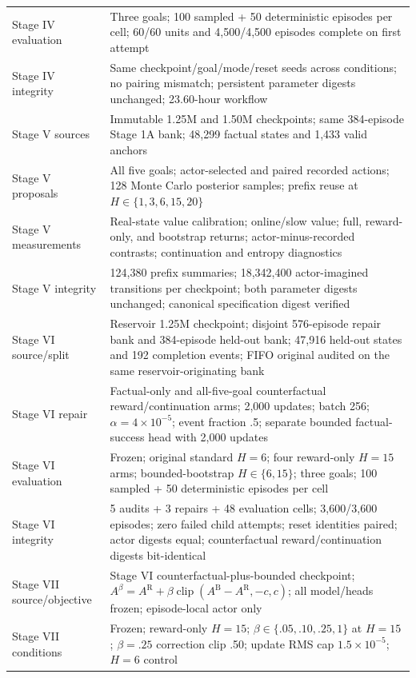 \documentclass[10pt]{article}
\begin{document}
{\begin{longtable}{>{\raggedright\arraybackslash}p{.24\linewidth}p{.68\linewidth}}
Stage IV evaluation & Three goals; 100 sampled + 50 deterministic episodes per cell; 60/60 units and 4,500/4,500 episodes complete on first attempt \\
Stage IV integrity & Same checkpoint/goal/mode/reset seeds across conditions; no pairing mismatch; persistent parameter digests unchanged; 23.60-hour workflow \\
Stage V sources & Immutable 1.25M and 1.50M checkpoints; same 384-episode Stage 1A bank; 48,299 factual states and 1,433 valid anchors \\
Stage V proposals & All five goals; actor-selected and paired recorded actions; 128 Monte Carlo posterior samples; prefix reuse at $H\in\{1,3,6,15,20\}$ \\
Stage V measurements & Real-state value calibration; online/slow value; full, reward-only, and bootstrap returns; actor-minus-recorded contrasts; continuation and entropy diagnostics \\
Stage V integrity & 124,380 prefix summaries; 18,342,400 actor-imagined transitions per checkpoint; both parameter digests unchanged; canonical specification digest verified \\
Stage VI source/split & Reservoir 1.25M checkpoint; disjoint 576-episode repair bank and 384-episode held-out bank; 47,916 held-out states and 192 completion events; FIFO original audited on the same reservoir-originating bank \\
Stage VI repair & Factual-only and all-five-goal counterfactual reward/continuation arms; 2,000 updates; batch 256; $\alpha=4\times10^{-5}$; event fraction .5; separate bounded factual-success head with 2,000 updates \\
Stage VI evaluation & Frozen; original standard $H=6$; four reward-only $H=15$ arms; bounded-bootstrap $H\in\{6,15\}$; three goals; 100 sampled + 50 deterministic episodes per cell \\
Stage VI integrity & 5 audits + 3 repairs + 48 evaluation cells; 3,600/3,600 episodes; zero failed child attempts; reset identities paired; actor digests equal; counterfactual reward/continuation digests bit-identical \\
Stage VII source/objective & Stage VI counterfactual-plus-bounded checkpoint; $A^\beta=A^{\mathrm R}+\beta\operatorname{clip}(A^{\mathrm B}-A^{\mathrm R},-c,c)$; all model/heads frozen; episode-local actor only \\
Stage VII conditions & Frozen; reward-only $H=15$; $\beta\in\{.05,.10,.25,1\}$ at $H=15$; $\beta=.25$ correction clip .50; update RMS cap $1.5\times10^{-5}$; $H=6$ control \\

\end{longtable}}
\end{document}
